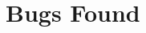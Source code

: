 \documentclass[10pt,conference,anonymous]{IEEEtran}
\begin{document}


\section{Bugs Found}
\label{sec:bugs}

\end{document}
